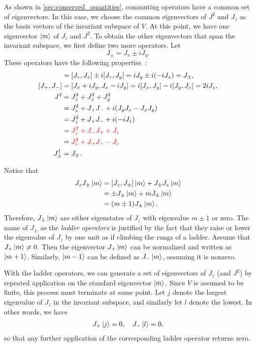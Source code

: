     As shown in \cref{sec:conserved_quantities}, commuting operators have a common set of eigenvectors. In this case, we choose the common eigenvectors of $J^2$ and $J_z$ as the basis vectors of the invariant subspace of $V$. At this point, we have one eigenvector $\ket{m}$ of $J_z$ and $J^2$. To obtain the other eigenvectors that span the invariant subspace, we first define two more operators. Let
    \begin{equation}
        J_\pm = J_x \pm i J_y.
    \end{equation}
    These operators have the following properties~\cite{Tung1985}:
    \begin{align*}
        [J_z, J_\pm] &= [J_z, J_x] \pm i[J_z, J_y] = i J_y \pm i(-i J_x) = J_\pm, \\
        [J_+, J_-] &= [J_x + i J_y, J_x - i J_y] = i[J_x, J_y] - i[J_y, J_x] = 2i J_z, \\
        J^2 
            &= J_z^2 + J_x^2 + J_y^2 \\
            &= J_z^2 + J_+ J_- + i(J_y J_x - J_x J_y) \\
            &= J_z^2 + J_+ J_- + i(-i J_z) \\
            &= \textcolor{red}{J_z^2 + J_- J_+ + J_z} \\
            &= \textcolor{red}{J_z^2 + J_+ J_- - J_z} \\
        J_\pm^\dagger &= J_\mp.
    \end{align*}
    
    Notice that
    \begin{align*}
        J_z J_\pm\ket{m} &= [J_z,J_\pm]\ket{m} + J_\pm J_z\ket{m} \\
        &= \pm J_\pm\ket{m} + m J_\pm\ket{m} \\
        &= (m\pm 1)J_\pm\ket{m}.
    \end{align*}
    Therefore, $J_\pm\ket{m}$ are either eigenstates of $J_z$ with eigenvalue $m\pm 1$ or zero. The name of $J_\pm$ as the \textit{ladder operators} is justified by the fact that they raise or lower the eigenvalue of $J_z$ by one unit as if climbing the rungs of a ladder. Assume that $J_+\ket{m}\neq 0$. Then the eigenvector $J_+\ket{m}$ can be normalized and written as $\ket{m+1}$. Similarly, $\ket{m-1}$ can be defined as $J_-\ket{m}$, assuming it is nonzero.

    With the ladder operators, we can generate a set of eigenvectors of $J_z$ (and $J^2$) by repeated application on the standard eigenvector $\ket{m}$. Since $V$ is assumed to be finite, this process must terminate at some point. Let $j$ denote the largest eigenvalue of $J_z$ in the invariant subspace, and similarly let $l$ denote the lowest. In other words, we have
    \begin{align*}
        J_+\ket{j} = 0, \quad J_-\ket{l} = 0,
    \end{align*}
    so that any further application of the corresponding ladder operator returns zero.
    
